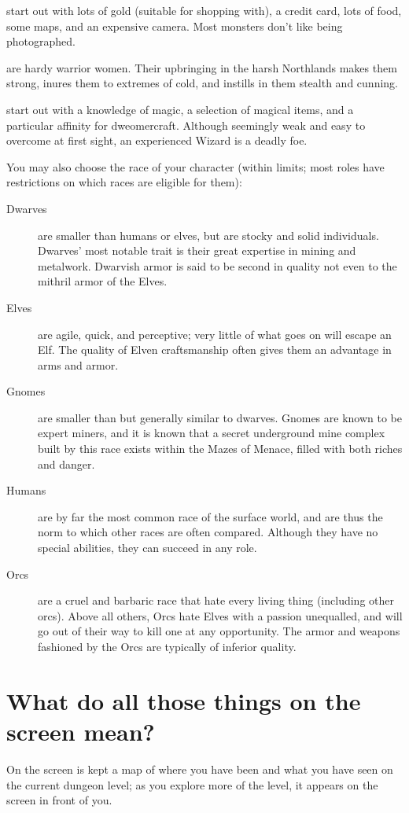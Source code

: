 \documentclass[titlepage]{article}
\begin{document}
\begin{description}
start out with lots of gold (suitable for shopping with),
a credit card, lots of food, some maps, and an expensive camera.  Most
monsters don't like being photographed.
%
\item[Valkyries]
are hardy warrior women.  Their upbringing in the harsh
Northlands makes them strong, inures them to extremes of cold, and instills
in them stealth and cunning.
%
\item[Wizards]
start out with a knowledge of magic, a selection of magical
items, and a particular affinity for dweomercraft.  Although seemingly weak
and easy to overcome at first sight, an experienced Wizard is a deadly foe.
\end{description}

You may also choose the race of your character (within limits; most
roles have restrictions on which races are eligible for them):

%
\begin{description}
\item[Dwarves]
are smaller than humans or elves, but are stocky and solid
individuals.  Dwarves' most notable trait is their great expertise in mining
and metalwork.  Dwarvish armor is said to be second in quality not even to the
mithril armor of the Elves.
%
\item[Elves]
are agile, quick, and perceptive; very little of what goes
on will escape an Elf.  The quality of Elven craftsmanship often gives
them an advantage in arms and armor.
%
\item[Gnomes]
are smaller than but generally similar to dwarves.  Gnomes are
known to be expert miners, and it is known that a secret underground mine
complex built by this race exists within the Mazes of Menace, filled with
both riches and danger.
%
\item[Humans]
are by far the most common race of the surface world, and
are thus the norm to which other races are often compared.  Although
they have no special abilities, they can succeed in any role.
%
\item[Orcs]
are a cruel and barbaric race that hate every living thing
(including other orcs).  Above all others, Orcs hate Elves with a passion
unequalled, and will go out of their way to kill one at any opportunity.
The armor and weapons fashioned by the Orcs are typically of inferior quality.
\end{description}

\section{What do all those things on the screen mean?}
On the screen is kept a map of where you have been and what you have
seen on the current dungeon level; as you explore more of the level,
it appears on the screen in front of you.
\end{document}
